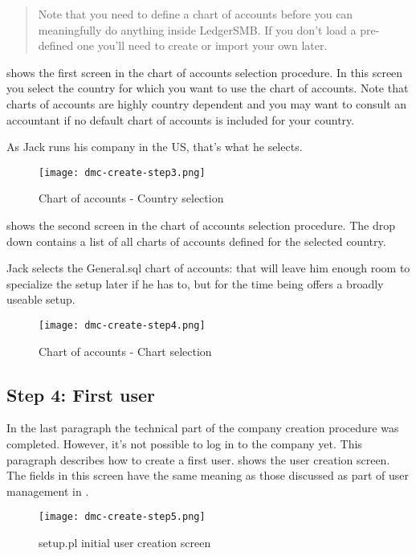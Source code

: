 \begin{quote}
Note that you need to define a chart of accounts before you can meaningfully do anything
inside LedgerSMB. If you don't load a pre-defined one you'll need to create or import your
own later.
\end{quote}

 shows the first screen in the chart of accounts selection procedure.
In this screen you select the country for which you want to use the chart of accounts. Note
that charts of accounts are highly country dependent and you may want to consult
an accountant if no default chart of accounts is included for your country.

As Jack runs his company in the US, that's what he selects.

\begin{figure}[h]
\centering
\texttt{[image: dmc-create-step3.png]}
\caption{Chart of accounts - Country selection}
\label{fig:setup-step3}
\end{figure}

 shows the second screen in the chart of accounts selection procedure.
The drop down contains a list of all charts of accounts defined for the selected country.

Jack selects the General.sql chart of accounts: that will leave him enough room to specialize
the setup later if he has to, but for the time being offers a broadly useable setup.

\begin{figure}[h]
\centering
\texttt{[image: dmc-create-step4.png]}
\caption{Chart of accounts - Chart selection}
\label{fig:setup-step4}
\end{figure}


\subsection{Step 4: First user}

In the last paragraph the technical part of the company creation procedure was completed.
However, it's not possible to log in to the company yet. This paragraph describes how to
create a first user.
 shows the user creation screen. The fields in this screen have
the same meaning as those discussed as part of user management in .

\begin{figure}[h]
\centering
\texttt{[image: dmc-create-step5.png]}
\caption{setup.pl initial user creation screen}
\label{fig:setup-step5}
\end{figure}

